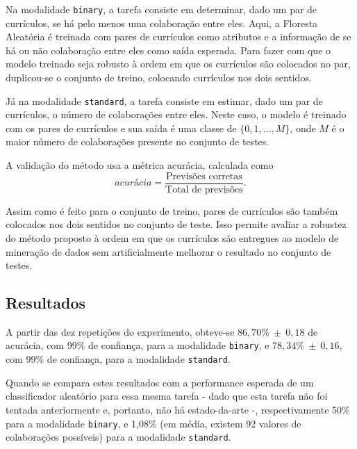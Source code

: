 \documentclass[12pt]{article}
\begin{document}
Na modalidade \texttt{binary}, a tarefa consiste em determinar, dado um par de currículos, se há pelo menos uma colaboração entre eles.
Aqui, a Floresta Aleatória é treinada com pares de currículos como atributos e a informação de se há ou não colaboração entre eles como saída esperada.
Para fazer com que o modelo treinado seja robusto à ordem em que os currículos são colocados no par, duplicou-se o conjunto de treino, colocando currículos nos dois sentidos.

Já na modalidade \texttt{standard}, a tarefa consiste em estimar, dado um par de currículos, o número de colaborações entre eles.
Neste caso, o modelo é treinado com os pares de currículos e sua saída é uma classe de $\{0, 1, ..., M\}$, onde $M$ é o maior número de colaborações presente no conjunto de testes.

A validação do método usa a métrica acurácia, calculada como
\begin{equation}
  \textit{acurácia} = \frac{\text{Previsões corretas}}{\text{Total de previsões}}.
\end{equation}

Assim como é feito para o conjunto de treino, pares de currículos são também colocados nos dois sentidos no conjunto de teste.
Isso permite avaliar a robustez do método proposto à ordem em que os currículos são entregues ao modelo de mineração de dados sem artificialmente melhorar o resultado no conjunto de testes.

\subsection{Resultados}
\label{sec:results}
A partir das dez repetições do experimento, obteve-se $86,70\%~\pm~0,18$ de acurácia, com 99\% de confiança, para a modalidade \texttt{binary}, e $78,34\%~\pm~0,16$, com 99\% de confiança, para a modalidade \texttt{standard}.

Quando se compara estes resultados com a performance esperada de um classificador aleatório para essa mesma tarefa - dado que esta tarefa não foi tentada anteriormente e, portanto, não há estado-da-arte -, respectivamente 50\% para a modalidade \texttt{binary}, e 1,08\% (em média, existem 92 valores de colaborações possíveis) para a modalidade \texttt{standard}.

\end{document}
